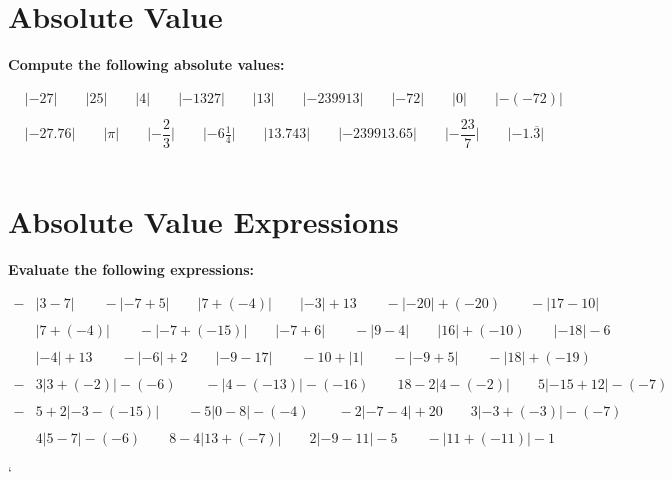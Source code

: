 \documentclass{article}
\begin{document}
\section{Absolute Value}

\textbf{Compute the following absolute values:}

\bigskip

\(\begin{aligned}
	&\lvert-27\rvert \qquad \lvert25\rvert \qquad \lvert4\rvert \qquad \lvert-1327\rvert \qquad
	\lvert13\rvert \qquad \lvert-239913\rvert \qquad \lvert-72\rvert \qquad \lvert0\rvert \qquad \lvert-(-72)\rvert\\\\
	&\lvert-27.76\rvert \qquad \lvert\pi\rvert \qquad \lvert-\dfrac{2}{3}\rvert \qquad \lvert -6\frac{1}{4}\rvert \qquad
	\lvert13.743\rvert \qquad \lvert-239913.65\rvert \qquad \lvert-\dfrac{23}{7}\rvert \qquad \lvert-1.\overline3\rvert\\\\
\end{aligned}\)

\section{Absolute Value Expressions}

\textbf{Evaluate the following expressions:}

\bigskip

\(\begin{aligned}
	-&\lvert3-7\rvert \qquad -\lvert-7+5\rvert \qquad \lvert7+(-4)\rvert \qquad \lvert-3\rvert+13 \qquad -\lvert-20\rvert+(-20) \qquad -\lvert17-10\rvert\\\\
	&\lvert7+(-4)\rvert \qquad -\lvert-7+(-15)\rvert \qquad \lvert-7+6\rvert \qquad -\lvert9-4\rvert \qquad \lvert16\rvert+(-10) \qquad \lvert-18\rvert-6\\\\
	&\lvert-4\rvert+13 \qquad -\lvert-6\rvert+2 \qquad \lvert-9-17\rvert \qquad -10+\lvert1\rvert \qquad -\lvert-9+5\rvert \qquad -\lvert18\rvert+(-19)\\\\
	-&3\lvert3+(-2)\rvert-(-6) \qquad -\lvert4-(-13)\rvert-(-16) \qquad 18-2\lvert4-(-2)\rvert \qquad 5\lvert-15+12\rvert-(-7)\\\\
	-&5+2\lvert-3-(-15)\rvert \qquad -5\lvert0-8\rvert-(-4) \qquad -2\lvert-7-4\rvert+20 \qquad 3\lvert-3+(-3)\rvert-(-7)\\\\
	&4\lvert5-7\rvert-(-6) \qquad 8-4\lvert13+(-7)\rvert \qquad 2\lvert-9-11\rvert-5 \qquad -\lvert11+(-11)\rvert-1\\\\
\end{aligned}\)
`
\end{document}
